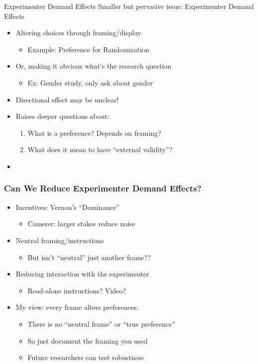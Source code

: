 \begin{frame}{Experimenter Demand Effects}
Smaller but pervasive issue: Experimenter Demand Effects
    \begin{itemize}
        \item Altering choices through framing/display
        \begin{itemize}
            \item Example: Preference for Randomization
        \end{itemize}
        \item Or, making it obvious what's the research question
        \begin{itemize}
            \item Ex: Gender study, only ask about gender
        \end{itemize}
        \item Directional effect may be unclear!
        \item Raises deeper questions about:
        \begin{enumerate}
            \item What is a preference? Depends on framing?
            \item What does it mean to have ``external validity''?
        \end{enumerate}
        \item 
    \end{itemize}
\end{frame}

\begin{frame}
\frametitle{Can We Reduce Experimenter Demand Effects?}
\begin{itemize}
    \item Incentives: Vernon's ``Dominance''
    \begin{itemize}
        \item Camerer: larger stakes reduce noise
    \end{itemize}
    \item Neutral framing/instructions
    \begin{itemize}
        \item But isn't ``neutral'' just another frame??
    \end{itemize}
    \item Reducing interaction with the experimenter
    \begin{itemize}
        \item Read-alone instructions? Video? 
    \end{itemize}
    \item My view: every frame alters preferences. 
    \begin{itemize}
        \item There is no ``neutral frame'' or ``true preference''
        \item So just document the framing you used
        \item Future researchers can test robustness
    \end{itemize}
\end{itemize}
\end{frame}


